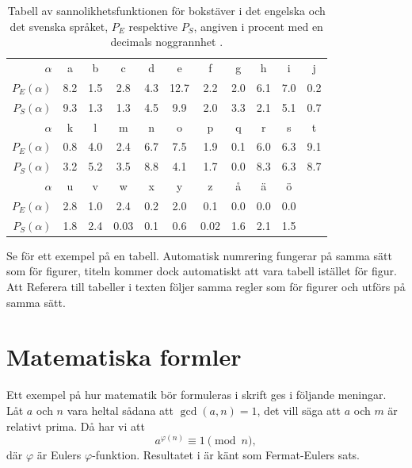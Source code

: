 \begin{table}
	\centering\small
  \begin{tabular}{r|cccccccccc}
    \hline\hline
    \(\alpha\) & a & b & c & d & e & f & g & h & i & j \\
    \(P_E(\alpha)\) & 8.2  & 1.5 & 2.8 & 4.3 & 12.7 & 2.2 & 2.0 &
    6.1 & 7.0 & 0.2 \\
    \(P_S(\alpha)\) & 9.3  & 1.3 & 1.3 & 4.5 & 9.9 & 2.0 & 3.3 &
    2.1 & 5.1 & 0.7 \\
    \hline\hline
    \(\alpha\) & k & l & m & n & o & p & q & r & s & t \\
    \(P_E(\alpha)\) & 0.8 & 4.0 & 2.4 & 6.7 & 7.5 & 1.9 & 0.1 & 6.0 & 6.3 &
    9.1 \\
    \(P_S(\alpha)\) & 3.2 & 5.2 & 3.5 & 8.8 & 4.1 & 1.7 & 0.0 & 8.3 & 6.3 &
    8.7 \\
    \hline\hline
    \(\alpha\) & u & v & w & x & y & z & å & ä & ö \\
    \(P_E(\alpha)\) & 2.8 & 1.0 & 2.4 & 0.2 & 2.0 & 0.1 & 0.0 & 0.0 & 0.0 \\
    \(P_S(\alpha)\) & 1.8 & 2.4 & 0.03 & 0.1 & 0.6 & 0.02 & 1.6 & 2.1 &
    1.5 \\
    \hline\hline
  \end{tabular}
	\caption[Tabell av sannolikhetsfunktionen för bokstäver i det engelska 
	respektive svenska språket.]
	{Tabell av sannolikhetsfunktionen för bokstäver i det engelska och det 
	svenska språket, \(P_E\) respektive \(P_S\), angiven i procent med en 
	decimals noggrannhet \citep{Wikipedia2011lf}.}
  \label{tbl:freq}
\end{table}

Se  för ett exempel på en tabell.
Automatisk numrering fungerar på samma sätt som för figurer, titeln kommer dock 
automatiskt att vara tabell istället för figur.
Att Referera till tabeller i texten följer samma regler som för figurer och 
utförs på samma sätt.


\section{Matematiska formler}
\label{sec:maths}
\noindent
Ett exempel på hur matematik bör formuleras i skrift ges i följande meningar.
Låt \(a\) och \(n\) vara heltal sådana att \(\gcd(a,n) = 1\), det vill säga att 
\(a\) och \(m\) är relativt prima.
Då har vi att
\begin{equation}
	\label{eq:fermat-euler}
	a^{\varphi(n)} \equiv 1 \pmod n,
\end{equation}
där \(\varphi\) är Eulers \(\varphi\)-funktion.
Resultatet i  är känt som Fermat-Eulers sats.

